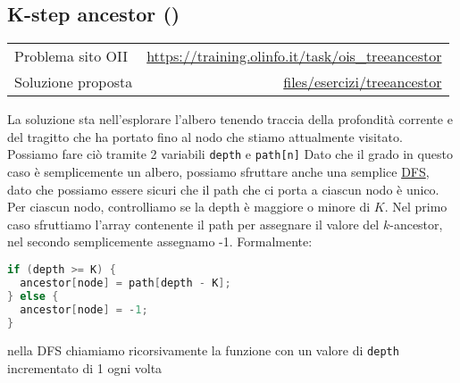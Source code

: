 \subsection{K-step ancestor {()}}
\label{sol treeancestor}
\begin{center}
	\begin{tabularx}{\textwidth}{X r}
		\toprule
		Problema sito OII  & \url{https://training.olinfo.it/task/ois_treeancestor}                          \\
		Soluzione proposta & \ttfamily\href{run:./files/esercizi/treeancestor/}{files/esercizi/treeancestor} \\
		\bottomrule
	\end{tabularx}
\end{center}
La soluzione sta nell'esplorare l'albero tenendo traccia della profondità corrente e del tragitto che ha portato fino al nodo che stiamo attualmente visitato. Possiamo fare ciò tramite 2 variabili \verb|depth| e \verb|path[n]|
\vskip3mm
Dato che il grado in questo caso è semplicemente un albero, possiamo sfruttare anche una semplice \href{https://en.wikipedia.org/wiki/Depth-first_search}{DFS}, dato che possiamo essere sicuri che il path che ci porta a ciascun nodo è unico.
\vskip3mm
Per ciascun nodo, controlliamo se la depth è maggiore o minore di $ K $. Nel primo caso sfruttiamo l'array contenente il path per assegnare il valore del $ k $-ancestor, nel secondo semplicemente assegnamo -1. Formalmente:
\begin{lstlisting}[language = java, frame = none]
if (depth >= K) {
  ancestor[node] = path[depth - K];
} else {
  ancestor[node] = -1;
}
\end{lstlisting}
nella DFS chiamiamo ricorsivamente la funzione con un valore di \verb|depth| incrementato di 1 ogni volta

